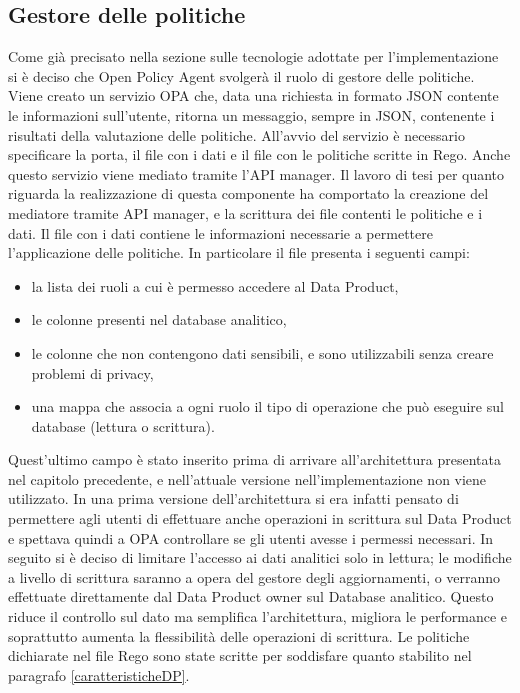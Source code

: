 \documentclass[12pt]{report}
\begin{document}
\subsection{Gestore delle politiche}
Come già precisato nella sezione sulle tecnologie adottate per l'implementazione si è deciso che Open Policy Agent svolgerà il ruolo di gestore delle politiche.
Viene creato un servizio OPA che, data una richiesta in formato JSON contente le informazioni sull'utente, ritorna un messaggio, sempre in JSON, contenente i risultati della valutazione delle politiche.
All'avvio del servizio è necessario specificare la porta, il file con i dati e il file con le politiche scritte in Rego.
Anche questo servizio viene mediato tramite l'API manager.
Il lavoro di tesi per quanto riguarda la realizzazione di  questa componente ha comportato la creazione del mediatore tramite API manager, e la scrittura dei file contenti le politiche e i dati.
Il file con i dati contiene le informazioni necessarie a permettere l'applicazione delle politiche.
In particolare il file presenta i seguenti campi:
\begin{itemize}
    \item la lista dei ruoli a cui è permesso accedere al Data Product,
    \item le colonne presenti nel database analitico,
    \item le colonne che non contengono dati sensibili, e sono utilizzabili senza creare problemi di privacy,
    \item una mappa che associa a ogni ruolo il tipo di operazione che può eseguire sul database (lettura o scrittura).
\end{itemize}
Quest'ultimo campo è stato inserito prima di arrivare all'architettura presentata nel capitolo precedente, e nell'attuale versione nell'implementazione non viene utilizzato.
In una prima versione dell'architettura si era infatti pensato di permettere agli utenti di effettuare anche operazioni in scrittura sul Data Product e spettava quindi a OPA controllare se gli utenti avesse i permessi necessari.
In seguito si è deciso di limitare l'accesso ai dati analitici solo in lettura; le modifiche a livello di scrittura saranno a opera del gestore degli aggiornamenti, o verranno effettuate direttamente dal Data Product owner sul Database analitico.
Questo riduce il controllo sul dato ma semplifica l'architettura, migliora le performance e soprattutto aumenta la flessibilità delle operazioni di scrittura.
Le politiche dichiarate nel file Rego sono state scritte per soddisfare quanto stabilito nel paragrafo \ref{caratteristicheDP}.
\end{document}
